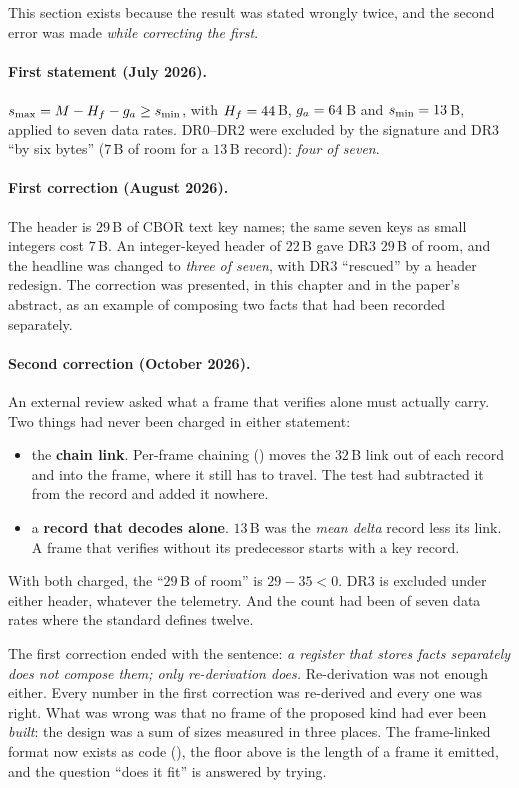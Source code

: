 This section exists because the result was stated wrongly twice, and the second error was made
\emph{while correcting the first}.

\paragraph{First statement (July 2026).} $s_{\max} = M - H_f - g_a \geq s_{\min}$, with $H_f = 44$\,B,
$g_a = 64$\,B and $s_{\min} = 13$\,B, applied to seven data rates. DR0--DR2 were excluded by the
signature and DR3 ``by six bytes'' ($7$\,B of room for a $13$\,B record): \emph{four of seven}.

\paragraph{First correction (August 2026).} The header is $29$\,B of CBOR text key names; the
same seven keys as small integers cost $7$\,B. An integer-keyed header of $22$\,B gave DR3
$29$\,B of room, and the headline was changed to \emph{three of seven}, with DR3 ``rescued'' by a
header redesign. The correction was presented, in this chapter and in the paper's abstract, as an
example of composing two facts that had been recorded separately.

\paragraph{Second correction (October 2026).} An external review asked what a frame that
verifies alone must actually carry. Two things had never been charged in either statement:

\begin{itemize}
\item the \textbf{chain link}. Per-frame chaining () moves the $32$\,B link
      out of each record and into the frame, where it still has to travel. The test had
      subtracted it from the record and added it nowhere.
\item a \textbf{record that decodes alone}. $13$\,B was the \emph{mean delta} record less its
      link. A frame that verifies without its predecessor starts with a key record.
\end{itemize}

With both charged, the ``$29$\,B of room'' is $29 - 35 < 0$. DR3 is excluded under either header,
whatever the telemetry. And the count had been of seven data rates where the standard defines
twelve.

\begin{remark}
The first correction ended with the sentence: \emph{a register that stores facts separately does
not compose them; only re-derivation does.} Re-derivation was not enough either. Every number in
the first correction was re-derived and every one was right. What was wrong was that no frame of
the proposed kind had ever been \emph{built}: the design was a sum of sizes measured in three
places. The frame-linked format now exists as code (), the floor above is the length of a
frame it emitted, and the question ``does it fit'' is answered by trying.
\end{remark}

